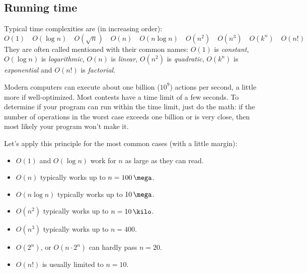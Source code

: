 \subsection{Running time}

Typical time complexities are (in increasing order):
\[
    O(1) \quad O(\log n) \quad O(\sqrt{n}) \quad O(n) \quad O(n\log n)
    \quad O(n^2) \quad O(n^3) \quad O(k^n) \quad O(n!)
\]
They are often called mentioned with their common names:
$O(1)$ is \emph{constant},
$O(\log n)$ is \emph{logarithmic},
$O(n)$ is \emph{linear},
$O(n^2)$ is \emph{quadratic},
$O(k^n)$ is \emph{exponential} and
$O(n!)$ is \emph{factorial}.

Modern computers can execute about one billion ($10^9$) actions
per second, a little more if well-optimized.
Most contests have a time limit of a few seconds.
To determine if your program can run within the time limit, just do the math:
if the number of operations in the worst case exceeds one billion
or is very close, then most
likely your program won't make it.

Let's apply this principle for the most common cases (with a little margin):
\begin{itemize}
    \item $O(1)$ and $O(\log n)$ work for $n$ as large as they can read.
    \item $O(n)$ typically works up to $n=100\,\mega$.
    \item $O(n \log n)$ typically works up to $10\,\mega$.
    \item $O(n^2)$ typically works up to $n=10\,\kilo$.
    \item $O(n^3)$ typically works up to $n=400$.
    \item $O(2^n)$, or $O(n\cdot2^n)$ can hardly pass $n=20$.
    \item $O(n!)$ is usually limited to $n=10$.
\end{itemize}
